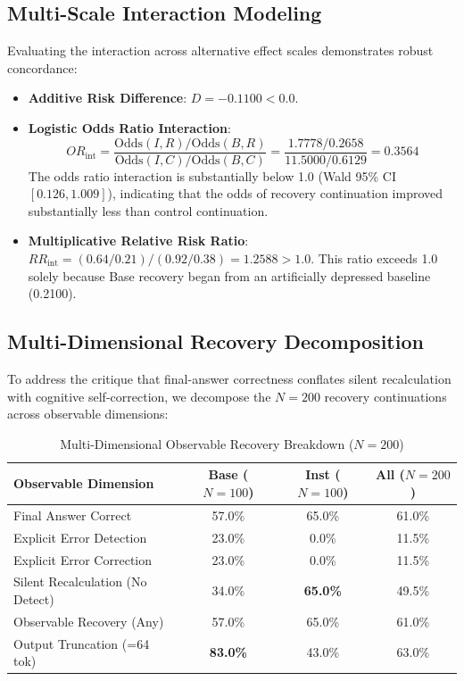 \documentclass[conference]{IEEEtran}
\begin{document}
\subsection{Multi-Scale Interaction Modeling}
Evaluating the interaction across alternative effect scales demonstrates robust concordance:
\begin{itemize}
    \item \textbf{Additive Risk Difference}: $D = -0.1100 < 0.0$.
    \item \textbf{Logistic Odds Ratio Interaction}:
    \begin{equation}
    OR_{\text{int}} = \frac{\text{Odds}(I, R) / \text{Odds}(B, R)}{\text{Odds}(I, C) / \text{Odds}(B, C)} = \frac{1.7778 / 0.2658}{11.5000 / 0.6129} = \mathbf{0.3564}
    \end{equation}
    The odds ratio interaction is substantially below 1.0 (Wald 95\% CI $[0.126, 1.009]$), indicating that the odds of recovery continuation improved substantially less than control continuation.
    \item \textbf{Multiplicative Relative Risk Ratio}: $RR_{\text{int}} = (0.64/0.21) / (0.92/0.38) = \mathbf{1.2588} > 1.0$. This ratio exceeds 1.0 solely because Base recovery began from an artificially depressed baseline (0.2100).
\end{itemize}

\subsection{Multi-Dimensional Recovery Decomposition}
To address the critique that final-answer correctness conflates silent recalculation with cognitive self-correction, we decompose the $N=200$ recovery continuations across observable dimensions:

\begin{table}[htbp]
\caption{Multi-Dimensional Observable Recovery Breakdown ($N=200$)}
\label{tab:observable_recovery}
\centering
\small
\begin{tabularx}{\columnwidth}{Xccc}
\toprule
\textbf{Observable Dimension} & \textbf{Base ($N=100$)} & \textbf{Inst ($N=100$)} & \textbf{All ($N=200$)} \\
\midrule
Final Answer Correct & 57.0\% & 65.0\% & 61.0\% \\
Explicit Error Detection & 23.0\% & 0.0\% & 11.5\% \\
Explicit Error Correction & 23.0\% & 0.0\% & 11.5\% \\
Silent Recalculation (No Detect) & 34.0\% & \textbf{65.0\%} & 49.5\% \\
Observable Recovery (Any) & 57.0\% & 65.0\% & 61.0\% \\
Output Truncation (=64 tok) & \textbf{83.0\%} & 43.0\% & 63.0\% \\
\bottomrule
\end{tabularx}
\vspace{-1.5mm}
\end{table}
\end{document}
